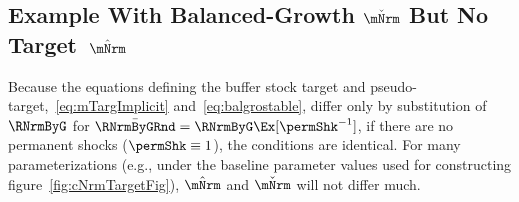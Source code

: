 \documentclass[BufferStockTheory]{subfiles}
\begin{document}

\subsection{Example With Balanced-Growth \texorpdfstring{$\mBalLvl$}{m} But No Target~\texorpdfstring{$\mTrgNrm$}{m}}

Because the equations defining the buffer stock target and pseudo-target,~\eqref{eq:mTargImplicit} and~\eqref{eq:balgrostable}, differ only by substitution of $\RNrmByG$ for $\bar{\RNrmByGRnd}=\RNrmByG \Ex[\permShk^{-1}]$, if there are no permanent shocks ($\permShk \equiv 1$), the conditions are identical.
For many parameterizations (e.g., under the baseline parameter values used for constructing figure~\ref{fig:cNrmTargetFig}), $\mTrgNrm$ and $\mBalLvl$ will not differ much.
\end{document}
